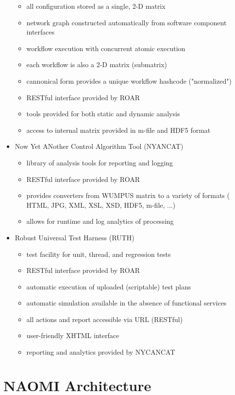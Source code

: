 \documentclass{article}[11pt]
\begin{document}
\begin{itemize}
\begin{itemize}
      \item all configuration stored as a single, 2-D matrix
      \item network graph constructed automatically from software component interfaces
      \item workflow execution with concurrent atomic execution
      \item each workflow is also a 2-D matrix (submatrix)
      \item cannonical form provides a unique workflow hashcode ("normalized")
      \item RESTful interface provided by ROAR
      \item tools provided for both static and dynamic analysis
      \item access to internal matrix provided in m-file and HDF5 format
    \end{itemize}
  \item Now Yet ANother Control Algorithm Tool (NYANCAT)
    \begin{itemize}
      \item library of analysis tools for reporting and logging
      \item RESTful interface provided by ROAR
      \item provides converters from WUMPUS matrix to a variety of formats ( HTML, JPG, XML, XSL, XSD, HDF5, m-file, ...)
      \item allows for runtime and log analytics of processing
    \end{itemize}
  \item Robust Universal Test Harness (RUTH)
    \begin{itemize}
      \item test facility for unit, thread, and regression tests
      \item RESTful interface provided by ROAR
      \item automatic execution of uploaded (scriptable) test plans
      \item automatic simulation available in the absence of functional services
      \item all actions and report accessible via URL (RESTful)
      \item user-friendly XHTML interface
      \item reporting and analytics provided by NYCANCAT
    \end{itemize}
\end{itemize}


\section{NAOMI Architecture}
\end{document}
